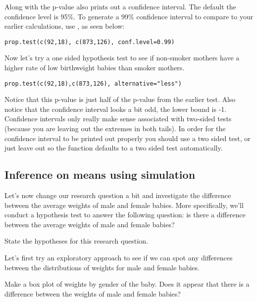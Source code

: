 \documentclass[11pt]{article}
\begin{document}
Along with the p-value  also prints out a confidence interval.  The default the confidence level is 95\%.  To generate a 99\% confidence interval to compare to your earlier calculations, use , as seen below:

\begin{lstlisting}
prop.test(c(92,18), c(873,126), conf.level=0.99)
\end{lstlisting}

Now let's try a one sided hypothesis test to see if non-smoker mothers have a higher rate of low birthweight babies than smoker mothers.

\begin{lstlisting}
prop.test(c(92,18),c(873,126), alternative="less")
\end{lstlisting}

Notice that this p-value is just half of the p-value from the earlier test. Also notice that the confidence interval looks a bit odd, the lower bound is -1. Confidence intervals only really make sense associated with two-sided tests (because you are leaving out the extremes in both tails). In order for the confidence interval to be printed out properly you should use a two sided test, or just leave out  so the function defaults to a two sided test automatically.

\subsection*{Inference on means using simulation}

Let's now change our research question a bit and investigate the difference between the average weights of male and female babies. More specifically, we'll conduct a hypothesis test to answer the following question: is there a difference between the average weights of male and female babies?

\begin{exercise}
State the hypotheses for this research question.
\end{exercise}

Let's first try an exploratory approach to see if we can spot any differences between the distributions of weights for male and female babies.

\begin{exercise}
Make a box plot of weights by gender of the baby. Does it appear that there is a difference between the weights of male and female babies?
\end{exercise}
\end{document}
